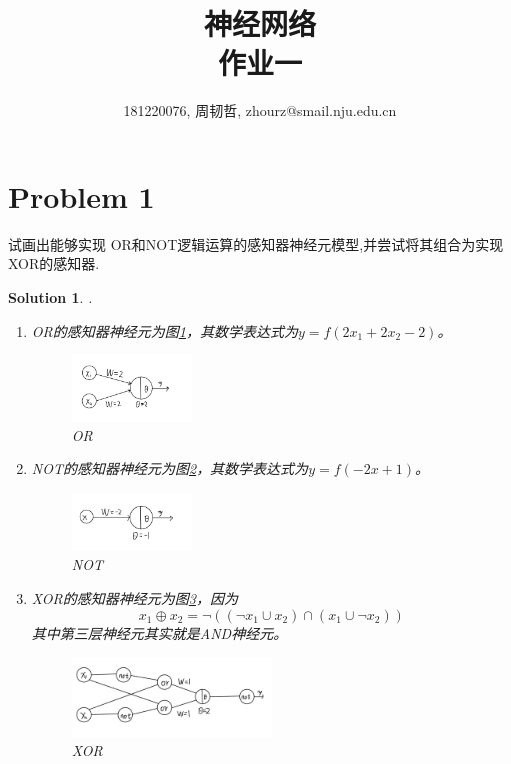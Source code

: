 \documentclass[a4paper,UTF8]{article}
\numberwithin{equation}{section}
\newtheorem*{solution}{Solution}
\begin{document}
\title{神经网络\\
作业一}
\author{181220076, 周韧哲, zhourz@smail.nju.edu.cn}
\maketitle

\section*{Problem 1}
试画出能够实现 OR和NOT逻辑运算的感知器神经元模型,并尝试将其组合为实现XOR的感知器.
\begin{solution}.
\begin{enumerate}[$\bullet$]
  \item OR的感知器神经元为图\ref{or}，其数学表达式为$y=f(2x_1+2x_2-2)$。
        \begin{figure}[h]
        \centering
        \includegraphics[width=0.3\textwidth]{or.png}
        \caption{OR}
        \label{or}
        \end{figure}
  \item NOT的感知器神经元为图\ref{not}，其数学表达式为$y=f(-2x+1)$。
      \begin{figure}[h]
  	     \centering
  	     \includegraphics[width=0.3\textwidth]{not.png}
     	 \caption{NOT}
     	 \label{not}
      \end{figure}
  \item XOR的感知器神经元为图\ref{xor}，因为$$x_1 \oplus {x_2}=\neg( ( \neg{x_1} \cup {x_2}) \cap (x_1 \cup \neg{x_2}))$$其中第三层神经元其实就是AND神经元。
  \begin{figure}[h]
  	\centering
  	\includegraphics[width=0.5\textwidth]{xor.png}
  	\caption{XOR}
  	\label{xor}
  \end{figure}
\end{enumerate}
\end{solution}
\end{document}
